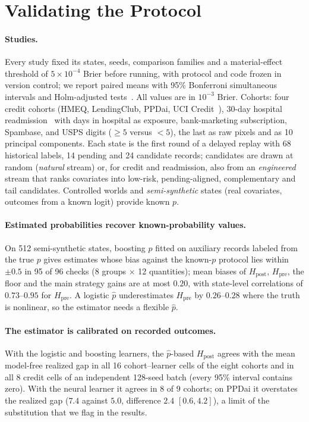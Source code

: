\documentclass[runningheads]{llncs}
\begin{document}
\section{Validating the Protocol}
\label{sec:validation}
\paragraph{Studies.} Every study fixed its states, seeds, comparison families and a material-effect threshold of $5\times10^{-4}$ Brier before running, with protocol and code frozen in version control; we report paired means with 95\% Bonferroni simultaneous intervals and Holm-adjusted tests~\cite{holm1979simple}. All values are in $10^{-3}$ Brier. Cohorts: four credit cohorts (HMEQ, LendingClub, PPDai, UCI Credit~\cite{sasHMEQ,lendingclubSource,ppdaiSource,he2018ensemble,yeh2009comparison}), 30-day hospital readmission~\cite{strack2014impact} with days in hospital as exposure, bank-marketing subscription, Spambase, and USPS digits ($\ge5$ versus $<5$), the last as raw pixels and as 10 principal components. Each state is the first round of a delayed replay with 68 historical labels, 14 pending and 24 candidate records; candidates are drawn at random (\emph{natural} stream) or, for credit and readmission, also from an \emph{engineered} stream that ranks covariates into low-risk, pending-aligned, complementary and tail candidates. Controlled worlds and \emph{semi-synthetic} states (real covariates, outcomes from a known logit) provide known $p$.

\paragraph{Estimated probabilities recover known-probability values.} On 512 semi-synthetic states, boosting $\hat p$ fitted on auxiliary records labeled from the true $p$ gives estimates whose bias against the known-$p$ protocol lies within $\pm0.5$ in 95 of 96 checks (8 groups $\times$ 12 quantities); mean biases of $H_{\mathrm{post}}$, $H_{\mathrm{pre}}$, the floor and the main strategy gains are at most $0.20$, with state-level correlations of $0.73$--$0.95$ for $H_{\mathrm{pre}}$. A logistic $\hat p$ underestimates $H_{\mathrm{pre}}$ by $0.26$--$0.28$ where the truth is nonlinear, so the estimator needs a flexible $\hat p$.

\paragraph{The estimator is calibrated on recorded outcomes.} With the logistic and boosting learners, the $\hat p$-based $H_{\mathrm{post}}$ agrees with the mean model-free realized gap in all 16 cohort--learner cells of the eight cohorts and in all 8 credit cells of an independent 128-seed batch (every 95\% interval contains zero). With the neural learner it agrees in 8 of 9 cohorts; on PPDai it overstates the realized gap ($7.4$ against $5.0$, difference $2.4$ $[0.6,4.2]$), a limit of the substitution that we flag in the results.
\end{document}
